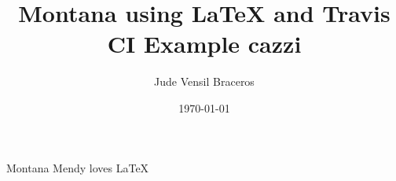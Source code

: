 \documentclass{article}
\title{Montana using LaTeX and Travis CI Example cazzi}
\author{Jude Vensil Braceros}
\date{\today}
\begin{document}
\maketitle

Montana Mendy loves LaTeX 
\end{document}
